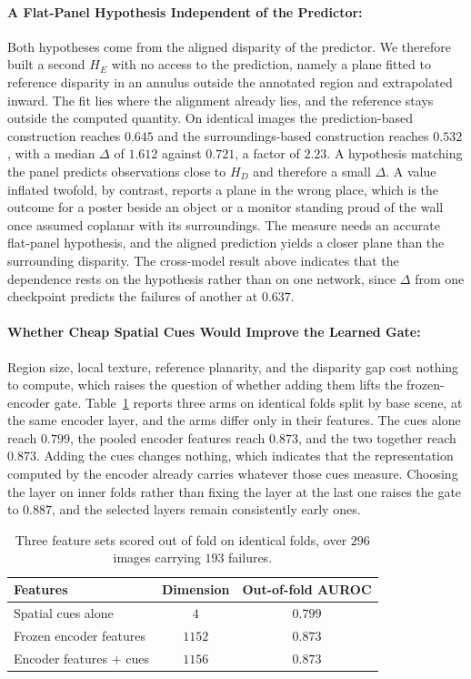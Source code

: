 \documentclass{article} %
\theoremstyle{defstyle}
\theoremstyle{plain}
\begin{document}
\paragraph{A Flat-Panel Hypothesis Independent of the Predictor:}
Both hypotheses come from the aligned disparity of the predictor. We therefore built a second
$H_E$ with no access to the prediction, namely a plane fitted to reference disparity in
an annulus outside the annotated region and extrapolated inward. The fit lies where the
alignment already lies, and the reference stays outside the computed quantity. On identical
images the prediction-based construction reaches $0.645$ and the surroundings-based
construction reaches $0.532$, with a median $\Delta$ of $1.612$ against $0.721$, a factor of
$2.23$. A hypothesis matching the panel predicts observations close to $H_D$ and therefore a
small $\Delta$. A value inflated twofold, by contrast, reports a plane in the wrong place,
which is the outcome for a poster beside an object or a monitor standing proud of the wall once
assumed coplanar with its surroundings. The measure needs an accurate flat-panel hypothesis,
and the aligned prediction yields a closer plane than the surrounding disparity. The
cross-model result above indicates that the dependence rests on the hypothesis rather than on
one network, since $\Delta$ from one checkpoint predicts the failures of another at $0.637$.

\paragraph{Whether Cheap Spatial Cues Would Improve the Learned Gate:}
Region size, local texture, reference planarity, and the disparity gap cost nothing to compute,
which raises the question of whether adding them lifts the frozen-encoder gate.
Table~\ref{tab:supp-cues} reports three arms on identical folds split by base scene, at the
same encoder layer, and the arms differ only in their features. The cues alone reach $0.799$,
the pooled encoder features reach $0.873$, and the two together reach $0.873$. Adding the cues
changes nothing, which indicates that the representation computed by the encoder already
carries whatever those cues measure. Choosing the layer on inner folds rather than fixing the
layer at the last one raises the gate to $0.887$, and the selected layers remain consistently
early ones.

\begin{table}[htb]
\caption{Three feature sets scored out of fold on identical folds, over $296$ images carrying $193$ failures.}
\label{tab:supp-cues}
\begin{center}
\footnotesize
\begin{tabular}{lcc}
\toprule
\textbf{Features} & \textbf{Dimension} & \textbf{Out-of-fold AUROC} \\
\midrule
Spatial cues alone & $4$ & $0.799$ \\
Frozen encoder features & $1152$ & $\mathbf{0.873}$ \\
Encoder features $+$ cues & $1156$ & $0.873$ \\
\bottomrule
\end{tabular}
\end{center}
\end{table}
\end{document}
